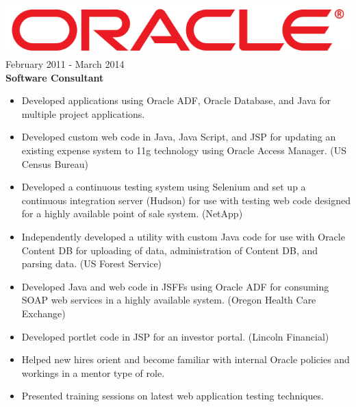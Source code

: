 \documentclass[12pt, line, margin]{res}
\begin{document}
\begin{resume}
                {\sl \includegraphics[scale=0.1]{resume_images/663px-Oracle_logo.png}} \hfill            February 2011 - March 2014 \\
                \textbf{Software Consultant}
                \begin{itemize}  \itemsep -2pt %
                 \item Developed applications using Oracle ADF,
                               Oracle Database, and Java for multiple project applications.
	      \item Developed custom web code in Java, Java Script, and JSP for \newline 
                               updating an existing expense system to 11g technology using \newline 
                               Oracle Access Manager. (US Census Bureau)
	      \item Developed a continuous testing system using Selenium
                               and set up a continuous integration server (Hudson)
                               for use with testing web code designed for a
                               highly available point of sale system. (NetApp)
	      \item Independently developed a utility with custom Java code for use with
                               Oracle Content DB for uploading of data, administration
                               of Content DB, and parsing data.
                               (US Forest Service)
      	      \item Developed Java and web code in JSFFs using Oracle ADF for \newline
                               consuming SOAP web services in a highly available system. \newline 
                               (Oregon Health Care Exchange)
	      \item Developed portlet code in JSP for an investor portal. \newline
                               (Lincoln Financial)
	      \item Helped new hires orient and become familiar with internal 
                               Oracle policies and workings in a mentor type of role.
	      \item Presented training sessions on latest web application testing \newline
                               techniques.
                 \end{itemize} 


\end{resume}
\end{document}
